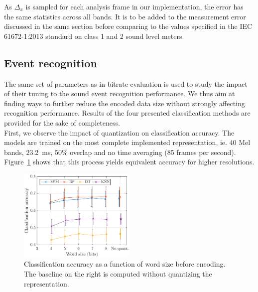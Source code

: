 \documentclass[sensors,article,submit,moreauthors,pdftex,10pt,a4paper]{mdpi}
\begin{document}
As $\Delta_x$ is sampled for each analysis frame in our implementation, the error has the same statistics across all bands. It is to be added to the measurement error discussed in the same section before comparing to the values specified in the IEC 61672-1:2013 \cite{iec-norm2} standard on class 1 and 2 sound level meters.

\subsection{Event recognition} \label{sec:eventRec}

The same set of parameters as in bitrate evaluation is used to study the impact of their tuning to the sound event recognition performance. We thus aim at finding ways to further reduce the encoded data size without strongly affecting recognition performance. Results of the four presented classification methods are provided for the sake of completeness.\\

First, we observe the impact of quantization on classification accuracy. The models are trained on the most complete implemented representation, ie. 40 Mel bands, 23.2~ms, 50\% overlap and no time averaging (85 frames per second). Figure~\ref{fig:class_mel_q} shows that this process yields equivalent accuracy for higher resolutions.\\

\begin{figure}[htbp]
	\centering
		\includegraphics[width=0.5\textwidth]{figures/class_mel_q.eps}
	\caption{Classification accuracy as a function of word size before encoding. The baseline on the right is computed without quantizing the representation.}
	\label{fig:class_mel_q}
\end{figure}
\end{document}
